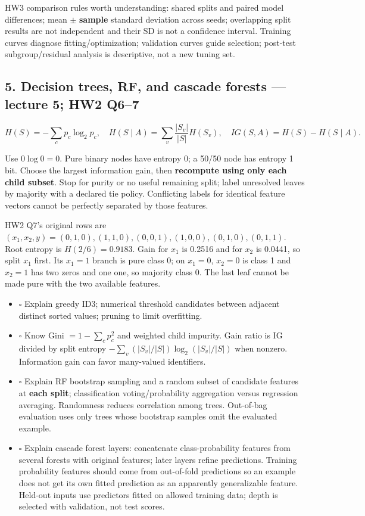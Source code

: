 \documentclass[11pt]{article}
\begin{document}
HW3 comparison rules worth understanding: shared splits and paired model differences; mean \ensuremath{\pm} \textbf{sample} standard deviation across seeds; overlapping split results are not independent and their SD is not a confidence interval. Training curves diagnose fitting/\allowbreak{}optimization; validation curves guide selection; post-test subgroup/\allowbreak{}residual analysis is descriptive, not a new tuning set.

\subsection*{5. Decision trees, RF, and cascade forests — lecture 5; HW2 Q6–7}

\[
H(S)=-\sum_c p_c\log_2 p_c,\quad H(S\mid A)=\sum_v\frac{|S_v|}{|S|}H(S_v),\quad IG(S,A)=H(S)-H(S\mid A).
\]

Use $0\log 0=0$. Pure binary nodes have entropy 0; a 50/\allowbreak{}50 node has entropy 1 bit. Choose the largest information gain, then \textbf{recompute using only each child subset}. Stop for purity or no useful remaining split; label unresolved leaves by majority with a declared tie policy. Conflicting labels for identical feature vectors cannot be perfectly separated by those features.

HW2 Q7's original rows are $(x_1,x_2,y)=(0,1,0),(1,1,0),(0,0,1),(1,0,0),(0,1,0),(0,1,1)$. Root entropy is $H(2/6)=0.9183$. Gain for $x_1$ is 0.2516 and for $x_2$ is 0.0441, so split $x_1$ first. Its $x_1=1$ branch is pure class 0; on $x_1=0$, $x_2=0$ is class 1 and $x_2=1$ has two zeros and one one, so majority class 0. The last leaf cannot be made pure with the two available features.

\begin{itemize}
\item \(\square\) Explain greedy ID3; numerical threshold candidates between adjacent distinct sorted values; pruning to limit overfitting.
\item \(\square\) Know Gini $=1-\sum_cp_c^2$ and weighted child impurity. Gain ratio is IG divided by split entropy $-\sum_v(|S_v|/|S|)\log_2(|S_v|/|S|)$ when nonzero. Information gain can favor many-valued identifiers.
\item \(\square\) Explain RF bootstrap sampling and a random subset of candidate features at \textbf{each split}; classification voting/\allowbreak{}probability aggregation versus regression averaging. Randomness reduces correlation among trees. Out-of-bag evaluation uses only trees whose bootstrap samples omit the evaluated example.
\item \(\square\) Explain cascade forest layers: concatenate class-probability features from several forests with original features; later layers refine predictions. Training probability features should come from out-of-fold predictions so an example does not get its own fitted prediction as an apparently generalizable feature. Held-out inputs use predictors fitted on allowed training data; depth is selected with validation, not test scores.
\end{itemize}
\end{document}
